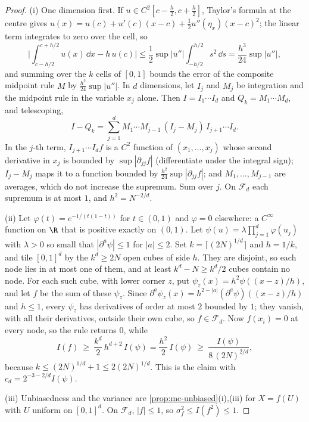 \begin{proof}
(i) One dimension first. If $u\in C^2[c-\frac h2,c+\frac h2]$, Taylor's formula at the centre
gives $u(x)=u(c)+u'(c)(x-c)+\frac12u''(\eta_x)(x-c)^2$; the linear term integrates to zero
over the cell, so
\[
  \Big|\int_{c-h/2}^{c+h/2}u(x)\,\dd x-h\,u(c)\Big|\le\frac12\sup|u''|\int_{-h/2}^{h/2}s^2\,\dd s
  =\frac{h^3}{24}\sup|u''|,
\]
and summing over the $k$ cells of $[0,1]$ bounds the error of the composite midpoint rule
$M$ by $\frac{h^2}{24}\sup|u''|$. In $d$ dimensions, let $I_j$ and $M_j$ be integration and the
midpoint rule in the variable $x_j$ alone. Then $I=I_1\cdots I_d$ and $Q_k=M_1\cdots M_d$, and
telescoping,
\[
  I-Q_k=\sum_{j=1}^dM_1\cdots M_{j-1}\,(I_j-M_j)\,I_{j+1}\cdots I_d .
\]
In the $j$-th term, $I_{j+1}\cdots I_df$ is a $C^2$ function of $(x_1,\dots,x_j)$ whose second
derivative in $x_j$ is bounded by $\sup|\partial_{jj}f|$ (differentiate under the integral
sign); $I_j-M_j$ maps it to a function bounded by $\frac{h^2}{24}\sup|\partial_{jj}f|$; and
$M_1,\dots,M_{j-1}$ are averages, which do not increase the supremum. Sum over $j$. On
$\mathcal F_d$ each supremum is at most $1$, and $h^2=N^{-2/d}$.

(ii) Let $\varphi(t)=e^{-1/(t(1-t))}$ for $t\in(0,1)$ and $\varphi=0$ elsewhere: a $C^\infty$
function on $\R$ that is positive exactly on $(0,1)$. Let
$\psi(u)=\lambda\prod_{j=1}^d\varphi(u_j)$ with $\lambda>0$ so small that $|\partial^a\psi|\le1$
for $|a|\le2$. Set $k=\lceil(2N)^{1/d}\rceil$ and $h=1/k$, and tile $[0,1]^d$ by the
$k^d\ge2N$ open cubes of side $h$. They are disjoint, so each node lies in at most one of
them, and at least $k^d-N\ge k^d/2$ cubes contain no node. For each such cube, with lower
corner $z$, put $\psi_z(x)=h^2\psi((x-z)/h)$, and let $f$ be the sum of these $\psi_z$. Since
$\partial^a\psi_z(x)=h^{2-|a|}(\partial^a\psi)((x-z)/h)$ and $h\le1$, every
$\psi_z$ has derivatives of order at most $2$ bounded by $1$; they vanish, with all their
derivatives, outside their own cube, so $f\in\mathcal F_d$. Now $f(x_i)=0$ at every node, so
the rule returns $0$, while
\[
  I(f)\ \ge\ \frac{k^d}{2}\,h^{d+2}\,I(\psi)=\frac{h^2}{2}\,I(\psi)\ \ge\ \frac{I(\psi)}{8\,(2N)^{2/d}},
\]
because $k\le(2N)^{1/d}+1\le2(2N)^{1/d}$. This is the claim with $c_d=2^{-3-2/d}I(\psi)$.

(iii) Unbiasedness and the variance are \cref{prop:mc-unbiased}(i),(iii) for $X=f(U)$ with $U$
uniform on $[0,1]^d$. On $\mathcal F_d$, $|f|\le1$, so $\sigma_f^2\le I(f^2)\le1$.
\end{proof}

